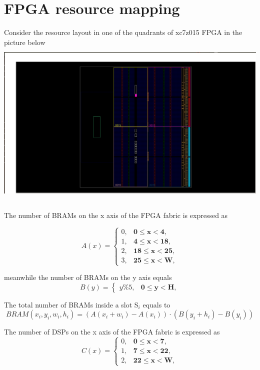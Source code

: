 \documentclass[11pt]{article}
\theoremstyle{definition}
\begin{document}
\section{FPGA resource mapping}
Consider the resource layout in one of the quadrants of xc7z015 FPGA in the picture below
\includegraphics[width=\textwidth, height=8cm]{graphics/fpga_1.png} \\ \\

The number of BRAMs on the x axis of the FPGA fabric is expressed as 

\begin{equation}
A(x) = \begin{cases}
0, & \textbf{0$\leq$x$<$4}, \\
1, & \textbf{4$\leq$x$<$18}, \\
2, & \textbf{18$\leq$x$<$25}, \\
3, & \textbf{25$\leq$x$<$W},
\end{cases}
\end{equation}

meanwhile the number of BRAMs on the y axis equals 
\begin{equation}
B(y) = \begin{cases} 
y\%5, & \textbf{0$\leq$y$<$H},
\end{cases}
\end{equation}

The total number of BRAMs inside a slot S$_i$ equals to \\
\begin{equation}
BRAM(x_i,y_i,w_i,h_i) =  (A(x_i+w_i) - A(x_i)) \cdot (B(y_i+h_i) - B(y_i))
\end{equation}

The number of DSPs on the x axis of the FPGA fabric is expressed as 
\begin{equation}
C(x) = \begin{cases}
0, & \textbf{0$\leq$x$<$7}, \\
1, & \textbf{7$\leq$x$<$22}, \\
2, & \textbf{22$\leq$x$<$W},
\end{cases}
\end{equation}
\end{document}
